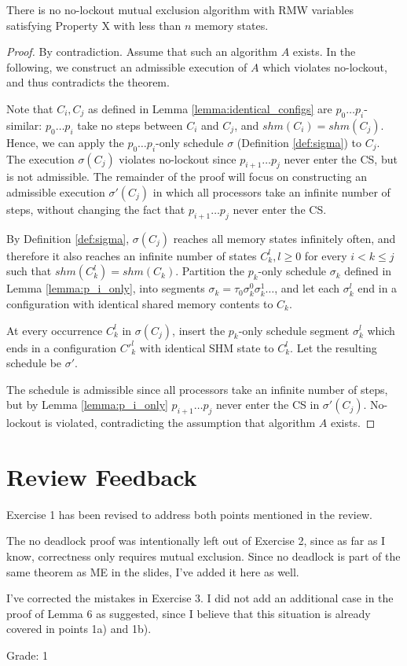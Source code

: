 \begin{theorem}
There is no no-lockout mutual exclusion algorithm with RMW variables satisfying
Property X with less than $n$ memory states.
\end{theorem}

\begin{proof}
By contradiction. Assume that such an algorithm $A$ exists.
In the following, we construct an admissible execution of $A$ which violates
no-lockout, and thus contradicts the theorem.

Note that $C_i, C_j$ as defined in Lemma \ref{lemma:identical_configs}
are $p_0 \ldots p_i$-similar: $p_0 \ldots p_i$ take no steps between
$C_i$ and $C_j$, and $shm(C_i) = shm(C_j)$. Hence, we can apply the 
$p_0 \ldots p_i$-only schedule $\sigma$ (Definition \ref{def:sigma})
to $C_j$. The execution $\sigma(C_j)$ violates no-lockout since $p_{i+1} \ldots p_j$
never enter the CS, but is not admissible. The remainder of the proof will
focus on constructing an admissible execution $\sigma'(C_j)$ in which
all processors take an infinite number of steps, without changing the fact that
$p_{i+1} \ldots p_j$ never enter the CS.

By Definition \ref{def:sigma}, $\sigma(C_j)$ reaches all memory states infinitely
often, and therefore it also reaches an infinite number of states
$C^l_k, l \geq 0$ for every $i < k \leq j$ such that $shm(C^l_k) = shm(C_k)$. 
Partition the $p_k$-only schedule $\sigma_k$ defined in Lemma \ref{lemma:p_i_only},
into segments $\sigma_k = \tau_0 \sigma_k^0 \sigma_k^1 \ldots$, and let each 
$\sigma_k^l$ end in a configuration with identical shared memory contents to $C_k$.

At every occurrence
$C^l_k$ in $\sigma(C_j)$, insert the $p_k$-only schedule segment $\sigma^l_k$ which ends in
a configuration $C'^l_k$ with identical SHM state to $C^l_k$.
Let the resulting schedule be $\sigma'$.

The schedule is admissible since all processors take
an infinite number of steps, but by Lemma \ref{lemma:p_i_only} $p_{i+1} \ldots p_j$
never enter the CS in $\sigma'(C_j)$. No-lockout is violated,
contradicting the assumption that algorithm $A$ exists.
\end{proof}

\section{Review Feedback}

Exercise 1 has been revised to address both points mentioned in the review.

The no deadlock proof was intentionally left out of Exercise 2, since as far as I know,
correctness only requires mutual exclusion. Since no deadlock is part of the same theorem
as ME in the slides, I've added it here as well.

I've corrected the mistakes in Exercise 3. I did not add an additional case in the proof of Lemma
6 as suggested, since I believe that this situation is already covered in points 1a) and 1b).

Grade: 1
